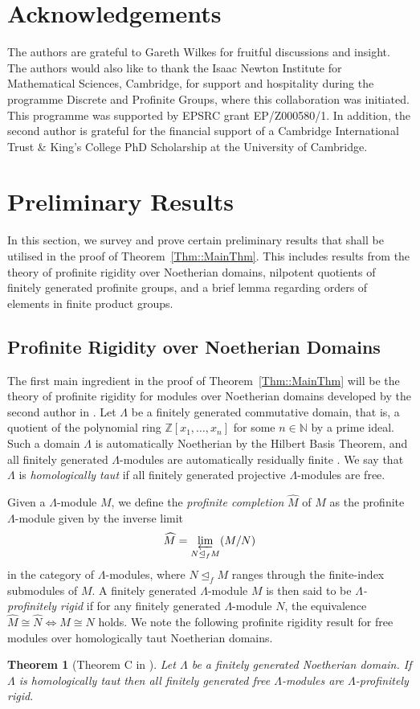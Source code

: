\documentclass{amsart}
\newtheorem{theorem}{Theorem}
\numberwithin{theorem}{section}
\numberwithin{equation}{section}
\newcommand{\Z}{\mathbb{Z}}
\newcommand{\hM}{\widehat{M}}
\newcommand{\hN}{\widehat{N}}
\begin{document}
\section*{Acknowledgements}

The authors are grateful to Gareth Wilkes for fruitful discussions and insight. The authors would also like to thank the Isaac Newton Institute for Mathematical Sciences, Cambridge, for support and hospitality during the programme Discrete and Profinite Groups, where this collaboration was initiated. This programme was supported by EPSRC grant EP/Z000580/1. In addition, the second author is grateful for the financial support of a Cambridge International Trust \& King's College PhD Scholarship at the University of Cambridge.

\section{Preliminary Results}\label{Sec::Prelims}
In this section, we survey and prove certain preliminary results that shall be utilised in the proof of Theorem~\ref{Thm::MainThm}. This includes results from the theory of profinite rigidity over Noetherian domains, nilpotent quotients of finitely generated profinite groups, and a brief lemma regarding orders of elements in finite product groups.
\subsection{Profinite Rigidity over Noetherian Domains}
The first main ingredient in the proof of Theorem~\ref{Thm::MainThm} will be the theory of profinite rigidity for modules over Noetherian domains developed by the second author in \cite{Wykowski2025_2}. Let $\Lambda$ be a finitely generated commutative domain, that is, a quotient of the polynomial ring $\Z[x_1, \ldots, x_n]$ for some $n \in \mathbb{N}$ by a prime ideal. Such a domain $\Lambda$ is automatically Noetherian by the Hilbert Basis Theorem, and all finitely generated $\Lambda$-modules are automatically residually finite \cite[Theorem 1]{Orzech1970}. We say that $\Lambda$ is \emph{homologically taut} if all finitely generated projective $\Lambda$-modules are free.

Given a $\Lambda$-module $M$, we define the \emph{profinite completion} $\hM$ of $M$ as the profinite $\Lambda$-module given by the inverse limit
\[
\hM = \varprojlim_{N \trianglelefteq_f M} (M/N)
\]
in the category of $\Lambda$-modules, where $N\trianglelefteq_f M$ ranges through the finite-index submodules of $M$. A finitely generated $\Lambda$-module $M$ is then said to be \emph{$\Lambda$-profinitely rigid} if for any finitely generated $\Lambda$-module $N$, the equivalence $\hM \cong \hN \Longleftrightarrow M \cong N$ holds. We note the following profinite rigidity result for free modules over homologically taut Noetherian domains.
\begin{theorem}[Theorem C in \cite{Wykowski2025_2}]\label{Thm::NoetherianDomains}
    Let $\Lambda$ be a finitely generated Noetherian domain. If $\Lambda$ is homologically taut then all finitely generated free $\Lambda$-modules are $\Lambda$-profinitely rigid. 
\end{theorem}
\end{document}
